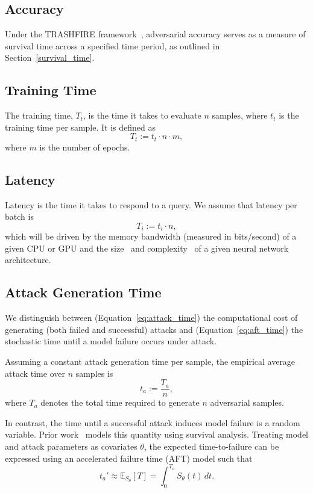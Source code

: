 \documentclass[conference]{IEEEtran}%
\begin{document}
\subsection{Accuracy}

Under the TRASHFIRE framework~\cite{meyers_aft}, adversarial accuracy serves as a measure of survival time across a specified time period, as outlined in Section~\ref{survival_time}.


\subsection{Training Time}

The training time, $T_t$, is the time it takes to evaluate $n$ samples, where $t_t$ is the training time per sample. It is defined as
\[
    T_t := t_t \cdot n  \cdot m,
\]
where $m$ is the number of epochs.


\subsection{Latency}

Latency is the time it takes to respond to a query. We assume that latency per batch is
\[
    T_i := t_i \cdot n,
\]
which will be driven by the memory bandwidth (measured in bits/second) of a given CPU or GPU and the size~\cite{vgg} and complexity~\cite{resnet} of a given neural network architecture.

\subsection{Attack Generation Time}

We distinguish between (Equation~\ref{eq:attack_time}) the computational cost of generating (both failed and successful) attacks and 
(Equation~\ref{eq:aft_time}) the stochastic time until a model failure occurs under attack.

Assuming a constant attack generation time per sample, the empirical average 
attack time over $n$ samples is
\begin{equation}
    t_a := \frac{T_a}{n},
    \label{eq:attack_time}
\end{equation}
where $T_a$ denotes the total time required to generate $n$ adversarial samples.

In contrast, the time until a successful attack induces model failure is a random variable. 
Prior work~\cite{meyers_aft} models this quantity using 
survival analysis. 
Treating model and attack parameters as covariates $\theta$, 
the expected time-to-failure can be expressed using an accelerated failure time 
(AFT) model such that
\begin{equation}
    t_a' \approx  \mathbb{E}_{S_\theta}[T] = \int_{0}^{T_a} S_{\theta}(t)\, dt.
    \label{eq:aft_time}
\end{equation}
\end{document}
